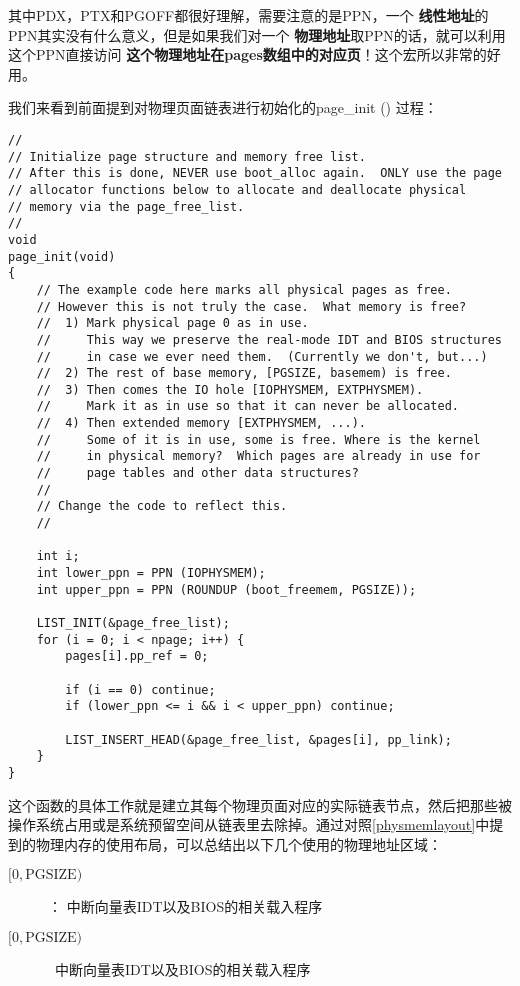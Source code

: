 \documentclass{article}
\newcommand{\highlight}[1]{{\bfseries \color{red}  #1}}
\newcommand{\funcname}[1]{{\ttfamily \small #1}}
\begin{document}
\begin{CJK*}{UTF8}{gkai}
其中PDX，PTX和PGOFF都很好理解，需要注意的是PPN，一个\highlight{线性地址}的PPN其实没有什么意义，但是如果我们对一个\highlight{物理地址}取PPN的话，就可以利用这个PPN直接访问\highlight{这个物理地址在pages数组中的对应页}！这个宏所以非常的好用。

我们来看到前面提到对物理页面链表进行初始化的\funcname{page\_init ()} 过程：



\begin{lstlisting}[style=ccode, title={\scriptsize \ttfamily \bfseries kern/pmap.c: boot\_init ()}]
//
// Initialize page structure and memory free list.
// After this is done, NEVER use boot_alloc again.  ONLY use the page
// allocator functions below to allocate and deallocate physical
// memory via the page_free_list.
//
void
page_init(void)
{
    // The example code here marks all physical pages as free.
    // However this is not truly the case.  What memory is free?
    //  1) Mark physical page 0 as in use.
    //     This way we preserve the real-mode IDT and BIOS structures
    //     in case we ever need them.  (Currently we don't, but...)
    //  2) The rest of base memory, [PGSIZE, basemem) is free.
    //  3) Then comes the IO hole [IOPHYSMEM, EXTPHYSMEM).
    //     Mark it as in use so that it can never be allocated.
    //  4) Then extended memory [EXTPHYSMEM, ...).
    //     Some of it is in use, some is free. Where is the kernel
    //     in physical memory?  Which pages are already in use for
    //     page tables and other data structures?
    //
    // Change the code to reflect this.
    //

    int i;
    int lower_ppn = PPN (IOPHYSMEM);
    int upper_ppn = PPN (ROUNDUP (boot_freemem, PGSIZE));

    LIST_INIT(&page_free_list);
    for (i = 0; i < npage; i++) {
        pages[i].pp_ref = 0;

        if (i == 0) continue;
        if (lower_ppn <= i && i < upper_ppn) continue;
 
        LIST_INSERT_HEAD(&page_free_list, &pages[i], pp_link);
    }
}
\end{lstlisting}

这个函数的具体工作就是建立其每个物理页面对应的实际链表节点，然后把那些被操作系统占用或是系统预留空间从链表里去除掉。通过对照\ref{physmemlayout}中提到的物理内存的使用布局，可以总结出以下几个使用的物理地址区域：


\begin{description}
\item[$[0, \mathrm{PGSIZE})$] ：\newline
中断向量表IDT以及BIOS的相关载入程序
\item[$[0, \text{PGSIZE})$] \
中断向量表IDT以及BIOS的相关载入程序


\end{description}
\end{CJK*}
\end{document}
